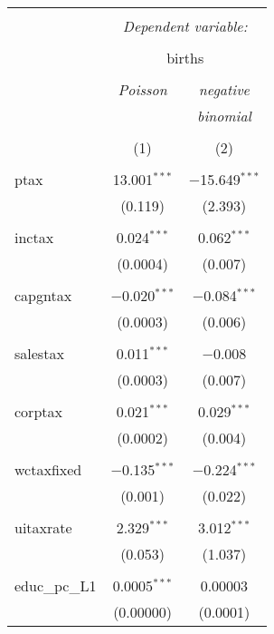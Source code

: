 
\begin{table}[!htbp] \centering 
  \caption{} 
  \label{} 
\begin{tabular}{@{\extracolsep{5pt}}lcc} 
\\[-1.8ex]\hline 
\hline \\[-1.8ex] 
 & \multicolumn{2}{c}{\textit{Dependent variable:}} \\ 
\cline{2-3} 
\\[-1.8ex] & \multicolumn{2}{c}{births} \\ 
\\[-1.8ex] & \textit{Poisson} & \textit{negative} \\ 
 & \textit{} & \textit{binomial} \\ 
\\[-1.8ex] & (1) & (2)\\ 
\hline \\[-1.8ex] 
 ptax & 13.001$^{***}$ & $-$15.649$^{***}$ \\ 
  & (0.119) & (2.393) \\ 
  & & \\ 
 inctax & 0.024$^{***}$ & 0.062$^{***}$ \\ 
  & (0.0004) & (0.007) \\ 
  & & \\ 
 capgntax & $-$0.020$^{***}$ & $-$0.084$^{***}$ \\ 
  & (0.0003) & (0.006) \\ 
  & & \\ 
 salestax & 0.011$^{***}$ & $-$0.008 \\ 
  & (0.0003) & (0.007) \\ 
  & & \\ 
 corptax & 0.021$^{***}$ & 0.029$^{***}$ \\ 
  & (0.0002) & (0.004) \\ 
  & & \\ 
 wctaxfixed & $-$0.135$^{***}$ & $-$0.224$^{***}$ \\ 
  & (0.001) & (0.022) \\ 
  & & \\ 
 uitaxrate & 2.329$^{***}$ & 3.012$^{***}$ \\ 
  & (0.053) & (1.037) \\ 
  & & \\ 
 educ\_pc\_L1 & 0.0005$^{***}$ & 0.00003 \\ 
  & (0.00000) & (0.0001) \\ 

\end{tabular}
\end{table}
